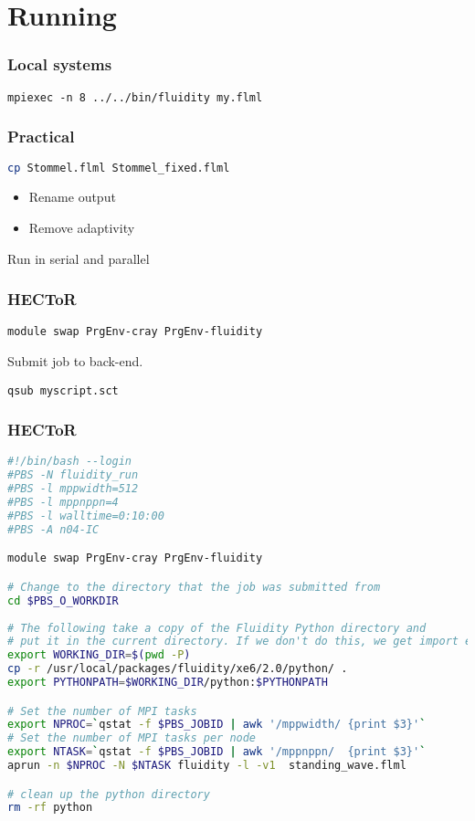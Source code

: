 \documentclass[12pt]{beamer}
\begin{document}
\section{Running}
\begin{frame}
    \frametitle{Local systems}

\texttt{mpiexec -n 8 ../../bin/fluidity my.flml}
\end{frame}

\begin{frame}[fragile]
    \frametitle{Practical}
\begin{lstlisting}[language=bash,basicstyle=\ttfamily]
cp Stommel.flml Stommel_fixed.flml
\end{lstlisting}
\begin{itemize}
    \item Rename output
    \item Remove adaptivity
\end{itemize}
Run in serial and parallel
\end{frame}


\begin{frame}
    \frametitle{HECToR}

\texttt{module swap PrgEnv-cray PrgEnv-fluidity}
\vspace{5mm}

Submit job to back-end.
\vspace{5mm}

\texttt{qsub myscript.sct}
\end{frame}

\begin{frame}[fragile]
    \frametitle{HECToR}
\vspace{-2mm}
\lstset{language=bash,basicstyle=\tiny}
\begin{lstlisting}[language=bash]
#!/bin/bash --login
#PBS -N fluidity_run
#PBS -l mppwidth=512
#PBS -l mppnppn=4
#PBS -l walltime=0:10:00
#PBS -A n04-IC

module swap PrgEnv-cray PrgEnv-fluidity

# Change to the directory that the job was submitted from
cd $PBS_O_WORKDIR
 
# The following take a copy of the Fluidity Python directory and
# put it in the current directory. If we don't do this, we get import errors. 
export WORKING_DIR=$(pwd -P)
cp -r /usr/local/packages/fluidity/xe6/2.0/python/ .
export PYTHONPATH=$WORKING_DIR/python:$PYTHONPATH

# Set the number of MPI tasks
export NPROC=`qstat -f $PBS_JOBID | awk '/mppwidth/ {print $3}'`
# Set the number of MPI tasks per node
export NTASK=`qstat -f $PBS_JOBID | awk '/mppnppn/  {print $3}'`
aprun -n $NPROC -N $NTASK fluidity -l -v1  standing_wave.flml

# clean up the python directory
rm -rf python
\end{lstlisting}
\end{frame}
\end{document}
